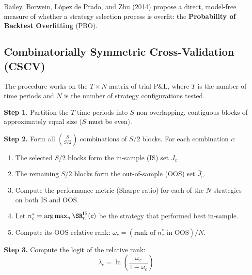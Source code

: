 Bailey, Borwein, L\'{o}pez de Prado, and Zhu (2014) propose a direct, model-free measure of whether a strategy selection process is overfit: the \textbf{Probability of Backtest Overfitting} (PBO).

\subsection{Combinatorially Symmetric Cross-Validation (CSCV)}

The procedure works on the $T \times N$ matrix of trial P\&L, where $T$ is the number of time periods and $N$ is the number of strategy configurations tested.

\begin{definition}
\textbf{Step 1.} Partition the $T$ time periods into $S$ non-overlapping, contiguous blocks of approximately equal size ($S$ must be even).

\textbf{Step 2.} Form all $\binom{S}{S/2}$ combinations of $S/2$ blocks. For each combination $c$:
\begin{enumerate}[nosep]
  \item The selected $S/2$ blocks form the in-sample (IS) set $J_c$.
  \item The remaining $S/2$ blocks form the out-of-sample (OOS) set $\bar{J}_c$.
  \item Compute the performance metric (Sharpe ratio) for each of the $N$ strategies on both IS and OOS.
  \item Let $n^*_c = \arg\max_n \SR_n^{\text{IS}}(c)$ be the strategy that performed best in-sample.
  \item Compute its OOS relative rank: $\omega_c = (\text{rank of } n^*_c \text{ in OOS}) / N$.
\end{enumerate}

\textbf{Step 3.} Compute the logit of the relative rank:
\begin{equation}
\lambda_c = \ln\!\left(\frac{\omega_c}{1 - \omega_c}\right)
\label{eq:logit}
\end{equation}


\end{definition}
